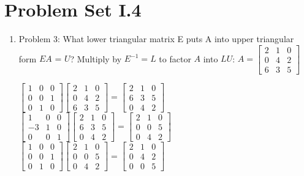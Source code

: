 \documentclass{article}
\renewcommand{\(}{\left(}
\renewcommand{\)}{\right)}
\theoremstyle{plain}
\theoremstyle{plain}
\theoremstyle{definition}
\begin{document}
\section{Problem Set I.4}
\begin{enumerate}[label*=\arabic*.,ref=\arabic*]
\item Problem 3: What lower triangular matrix E puts A into upper triangular form $\textit{EA = U}$? Multiply by $E^{-1} = L$ to factor $A$ into $LU$: $A = \begin{bmatrix} 2 & 1 & 0 \\ 0 & 4 & 2 \\ 6 & 3 & 5 \end{bmatrix}$
\begin{shaded}
$\begin{bmatrix} 1 & 0 & 0 \\ 0 & 0 & 1 \\ 0 & 1 & 0 \end{bmatrix} \begin{bmatrix} 2 & 1 & 0 \\ 0 & 4 & 2 \\ 6 & 3 & 5 \end{bmatrix} = \begin{bmatrix} 2 & 1 & 0 \\ 6 & 3 & 5 \\ 0 & 4 & 2 \end{bmatrix}$ \\

$\begin{bmatrix} 1 & 0 & 0 \\ -3 & 1 & 0 \\ 0 & 0 & 1 \end{bmatrix} \begin{bmatrix} 2 & 1 & 0 \\ 6 & 3 & 5 \\ 0 & 4 & 2 \end{bmatrix} = \begin{bmatrix} 2 & 1 & 0 \\ 0 & 0 & 5 \\ 0 & 4 & 2 \end{bmatrix}$ \\

$\begin{bmatrix} 1 & 0 & 0 \\ 0 & 0 & 1 \\ 0 & 1 & 0 \end{bmatrix} \begin{bmatrix} 2 & 1 & 0 \\ 0 & 0 & 5 \\ 0 & 4 & 2 \end{bmatrix} = \begin{bmatrix} 2 & 1 & 0 \\ 0 & 4 & 2 \\ 0 & 0 & 5 \end{bmatrix}$ \\


\end{shaded}
\end{enumerate}
\end{document}
